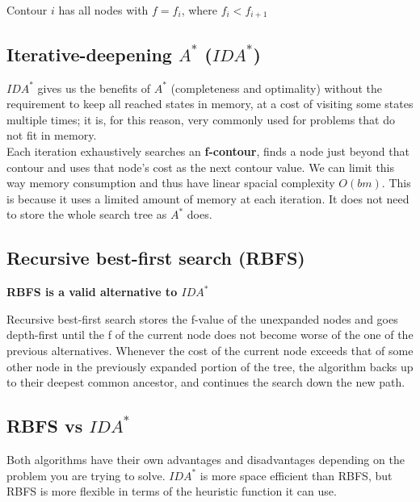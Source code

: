 \documentclass{article}
\begin{document}
\begin{center}
    Contour $i$ has all nodes with $f = f_i$, where $f_i < f_{i+1}$
\end{center}

\subsection{Iterative-deepening $A^*$ ($IDA^*$)}

$IDA^*$ gives us the benefits of $A^*$ (completeness and optimality) without the requirement to keep all reached states in memory, at a cost of visiting some states multiple times; it is, for this reason, very commonly used for problems that do not fit in memory. \\

Each iteration exhaustively searches an \textbf{f-contour}, finds a node just beyond that contour and uses that node's cost as the next contour value. We can limit this way memory consumption and thus have linear spacial complexity $O(bm)$. This is because it uses a limited amount of memory at each iteration. It does not need to store the whole search tree as $A^*$ does.

\newpage

\subsection{Recursive best-first search (RBFS)}

\textbf{RBFS is a valid alternative to $IDA^*$}

Recursive best-first search stores the f-value of the unexpanded nodes and goes depth-first until the f of the current node does not become worse of the one of the previous alternatives. Whenever the cost of the current node exceeds that of some other node in the previously expanded portion of the tree, the algorithm backs up to their deepest common ancestor, and continues the search down the new path. \\

\subsection{RBFS vs $IDA^*$}

Both algorithms have their own advantages and disadvantages depending on the problem you are trying to solve. $IDA^*$ is more space efficient than RBFS, but RBFS is more flexible in terms of the heuristic function it can use. \\
\end{document}
